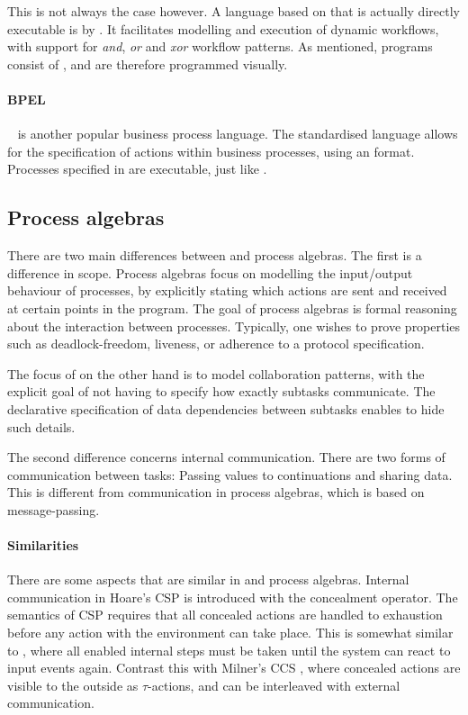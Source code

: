 This is not always the case however. A language based on \WFN that is
actually directly executable is \YAWL by \citet{DBLP:journals/is/AalstH05}.
It facilitates modelling and execution of
dynamic workflows, with support for \emph{and}, \emph{or} and \emph{xor} workflow patterns. As
mentioned, \YAWL programs consist of \WFN, and are therefore programmed
visually.

\paragraph{BPEL}

\BPEL~\cite{bpel} is another popular business process language. The standardised
language allows for the specification of actions within business processes,
using an \XML format. Processes specified in \BPEL are executable, just like \YAWL.



\subsection{Process algebras}

There are two main differences between \TOP and process algebras.
The first is a difference in scope.
Process algebras focus on modelling the input/output behaviour of processes, by explicitly stating which actions are sent and received at certain points in the program.
The goal of process algebras is formal reasoning about the interaction between processes.
Typically, one wishes to prove properties such as deadlock-freedom, liveness, or adherence to a protocol specification.

The focus of \TOP on the other hand is to model collaboration patterns, with the explicit goal of not having to specify how exactly subtasks communicate.
The declarative specification of data dependencies between subtasks enables \TOP to hide such details.

The second difference concerns internal communication.
There are two forms of communication between tasks: Passing values to continuations and sharing data.
This is different from communication in process algebras, which is based on message-passing.


\paragraph{Similarities}
There are some aspects that are similar in \TOPHAT and process algebras.
Internal communication in Hoare's CSP \cite{books/Hoare85CSP} is introduced with the concealment operator.
The semantics of CSP requires that all concealed actions are handled to exhaustion before any action with the environment can take place.
This is somewhat similar to \TOPHAT, where all enabled internal steps must be taken until the system can react to input events again.
Contrast this with Milner's CCS \cite{books/Milner89CAC}, where concealed actions are visible to the outside as $\tau$-actions, and can be interleaved with external communication.

